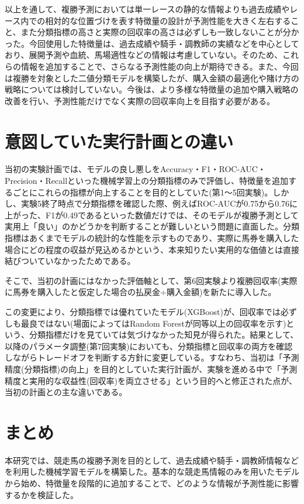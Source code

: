 \documentclass[dvipdfmx, a4paper, 11pt, titlepage]{jsarticle}
\begin{document}
以上を通して、複勝予測においては単一レースの静的な情報よりも過去成績やレース内での相対的な位置づけを表す特徴量の設計が予測性能を大きく左右すること、また分類指標の高さと実際の回収率の高さは必ずしも一致しないことが分かった。今回使用した特徴量は、過去成績や騎手・調教師の実績などを中心としており、展開予測や血統、馬場適性などの情報は考慮していない。そのため、これらの情報を追加することで、さらなる予測性能の向上が期待できる。また、今回は複勝を対象とした二値分類モデルを構築したが、購入金額の最適化や賭け方の戦略については検討していない。今後は、より多様な特徴量の追加や購入戦略の改善を行い、予測性能だけでなく実際の回収率向上を目指す必要がある。

\section{意図していた実行計画との違い}
当初の実験計画では、モデルの良し悪しをAccuracy・F1・ROC-AUC・Precision・Recallといった機械学習上の分類指標のみで評価し、特徴量を追加するごとにこれらの指標が向上することを目的としていた(第1〜5回実験)。しかし、実験5終了時点で分類指標を確認した際、例えばROC-AUCが0.75から0.76に上がった、F1が0.49であるといった数値だけでは、そのモデルが複勝予測として実用上「良い」のかどうかを判断することが難しいという問題に直面した。分類指標はあくまでモデルの統計的な性能を示すものであり、実際に馬券を購入した場合にどの程度の収益が見込めるかという、本来知りたい実用的な価値とは直接結びついていなかったためである。

そこで、当初の計画にはなかった評価軸として、第6回実験より複勝回収率(実際に馬券を購入したと仮定した場合の払戻金÷購入金額)を新たに導入した。

この変更により、分類指標では優れていたモデル(XGBoost)が、回収率では必ずしも最良ではない(場面によってはRandom Forestが同等以上の回収率を示す)という、分類指標だけを見ていては気づけなかった知見が得られた。結果として、以降のパラメータ調整(第7回実験)においても、分類指標と回収率の両方を確認しながらトレードオフを判断する方針に変更している。すなわち、当初は「予測精度(分類指標)の向上」を目的としていた実行計画が、実験を進める中で「予測精度と実用的な収益性(回収率)を両立させる」という目的へと修正された点が、当初の計画との主な違いである。

\section{まとめ}
本研究では、競走馬の複勝予測を目的として、過去成績や騎手・調教師情報などを利用した機械学習モデルを構築した。基本的な競走馬情報のみを用いたモデルから始め、特徴量を段階的に追加することで、どのような情報が予測性能に影響するかを検証した。
\end{document}
